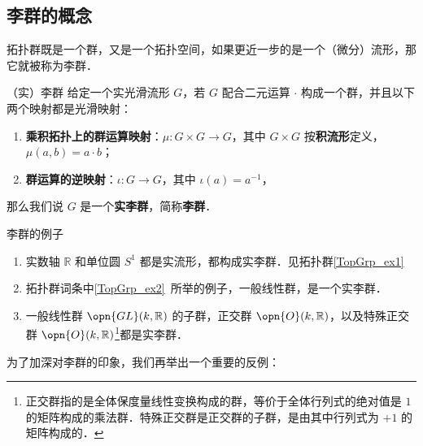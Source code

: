 

\begin{issues}
\issueDraft
\end{issues}

\subsection{李群的概念}

拓扑群既是一个群，又是一个拓扑空间，如果更近一步的是一个（微分）流形，那它就被称为李群．
\begin{definition}{（实）李群}\label{LieGrp_def3}
给定一个实光滑流形 $G$，若 $G$ 配合二元运算 $\cdot$ 构成一个群，并且以下两个映射都是光滑映射：
\begin{enumerate}
\item \textbf{乘积拓扑上的群运算映射}：$\mu:G\times G\to G$，其中 $G\times G$ 按\textbf{积流形}定义，$\mu(a,b)=a\cdot b$；
\item \textbf{群运算的逆映射}：$\iota:G\to G$，其中 $\iota(a)=a^{-1}$，
\end{enumerate}
那么我们说 $G$ 是一个\textbf{实李群}，简称\textbf{李群}．
\end{definition}


\begin{example}{李群的例子}
\begin{enumerate}
\item 实数轴 $\mathbb{R}$ 和单位圆 $S^1$ 都是实流形，都构成实李群．见拓扑群\autoref{TopGrp_ex1}~
\item 拓扑群词条中\autoref{TopGrp_ex2}~所举的例子，一般线性群，是一个实李群．
\item 一般线性群 $\opn{GL}(k, \mathbb{R})$ 的子群，正交群 $\opn{O}(k, \mathbb{R})$，以及特殊正交群 $\opn{O}(k, \mathbb{R})$\footnote{正交群指的是全体保度量线性变换构成的群，等价于全体行列式的绝对值是 $1$ 的矩阵构成的乘法群．特殊正交群是正交群的子群，是由其中行列式为 $+1$ 的矩阵构成的．}都是实李群．
\end{enumerate}
\end{example}

为了加深对李群的印象，我们再举出一个重要的反例：

